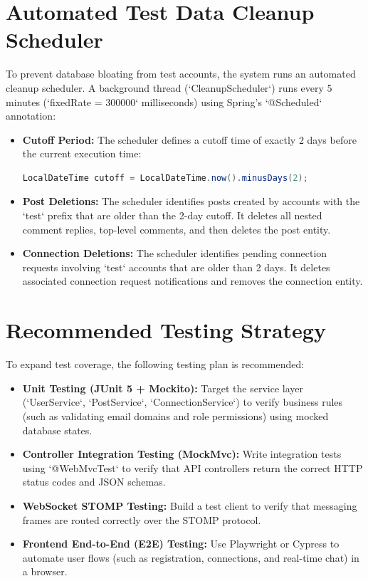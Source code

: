 \section{Automated Test Data Cleanup Scheduler}
To prevent database bloating from test accounts, the system runs an automated cleanup scheduler. A background thread (`CleanupScheduler`) runs every 5 minutes (`fixedRate = 300000` milliseconds) using Spring's `@Scheduled` annotation:
\begin{itemize}
    \item \textbf{Cutoff Period:} The scheduler defines a cutoff time of exactly 2 days before the current execution time:
    \begin{lstlisting}[language=java]
    LocalDateTime cutoff = LocalDateTime.now().minusDays(2);
    \end{lstlisting}
    \item \textbf{Post Deletions:} The scheduler identifies posts created by accounts with the `test` prefix that are older than the 2-day cutoff. It deletes all nested comment replies, top-level comments, and then deletes the post entity.
    \item \textbf{Connection Deletions:} The scheduler identifies pending connection requests involving `test` accounts that are older than 2 days. It deletes associated connection request notifications and removes the connection entity.
\end{itemize}

\section{Recommended Testing Strategy}
To expand test coverage, the following testing plan is recommended:
\begin{itemize}
    \item \textbf{Unit Testing (JUnit 5 + Mockito):} Target the service layer (`UserService`, `PostService`, `ConnectionService`) to verify business rules (such as validating email domains and role permissions) using mocked database states.
    \item \textbf{Controller Integration Testing (MockMvc):} Write integration tests using `@WebMvcTest` to verify that API controllers return the correct HTTP status codes and JSON schemas.
    \item \textbf{WebSocket STOMP Testing:} Build a test client to verify that messaging frames are routed correctly over the STOMP protocol.
    \item \textbf{Frontend End-to-End (E2E) Testing:} Use Playwright or Cypress to automate user flows (such as registration, connections, and real-time chat) in a browser.
\end{itemize}
